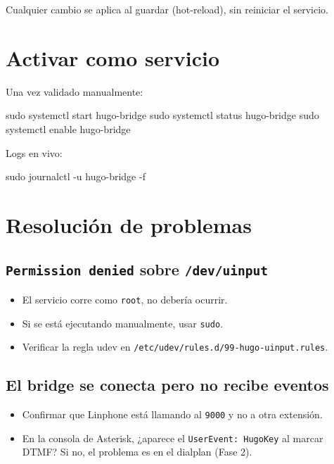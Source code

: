 Cualquier cambio se aplica al guardar (hot-reload), sin reiniciar el servicio.

\section{Activar como servicio}

Una vez validado manualmente:

\begin{shellcode}
sudo systemctl start hugo-bridge
sudo systemctl status hugo-bridge
sudo systemctl enable hugo-bridge
\end{shellcode}

Logs en vivo:

\begin{shellcode}
sudo journalctl -u hugo-bridge -f
\end{shellcode}

\section{Resolución de problemas}

\subsection{\texttt{Permission denied} sobre \texttt{/dev/uinput}}

\begin{itemize}
  \item El servicio corre como \texttt{root}, no debería ocurrir.
  \item Si se está ejecutando manualmente, usar \texttt{sudo}.
  \item Verificar la regla udev en \texttt{/etc/udev/rules.d/99-hugo-uinput.rules}.
\end{itemize}

\subsection{El bridge se conecta pero no recibe eventos}

\begin{itemize}
  \item Confirmar que Linphone está llamando al \texttt{9000} y no a otra extensión.
  \item En la consola de Asterisk, ¿aparece el \texttt{UserEvent: HugoKey} al marcar DTMF? Si no, el problema es en el dialplan (Fase 2).
\end{itemize}

